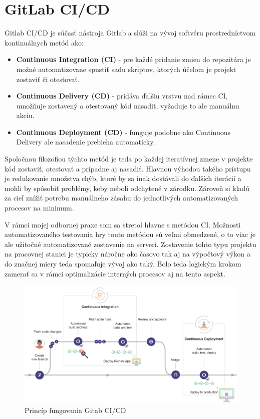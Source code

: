 \documentclass[slovak, bachelorpractice]{diploma}
\begin{document}
\section{GitLab CI/CD}
\label{sec:GitLab}
Gitlab CI/CD \cite{Cicd} je súčasť nástroja Gitlab a slúži na vývoj softvéru prostredníctvom kontinuálnych metód ako:
\begin{itemize}
  \item \textbf{Continuous Integration (CI)} - pre každé pridanie zmien do repozitára je možné automatizovane spustiť sadu skriptov, ktorých účelom je projekt zostaviť či otestovať.
  \item \textbf{Continuous Delivery (CD)} - pridáva ďalšiu vrstvu nad rámec CI, umožňuje zostavený a otestovaný kód nasadiť, vyžaduje to ale manuálnu akciu.
  \item \textbf{Continuous Deployment (CD)} - funguje podobne ako Continuous Delivery ale nasadenie prebieha automaticky.
\end{itemize}
Spoločnou filozofiou týchto metód je teda po každej iteratívnej zmene v projekte kód zostaviť, otestovať a prípadne aj nasadiť. Hlavnou výhodou takého prístupu je redukovanie množstva chýb, ktoré by sa inak dostávali do ďalších iterácií a mohli by spôsobiť problémy, keby neboli odchytené v zárodku. Zároveň si kladú za cieľ znížiť potrebu manuálneho zásahu do jednotlivých automatizovaných procesov na minimum.

V rámci mojej odbornej praxe som sa stretol hlavne s metódou CI. Možnosti automatizovaného testovania hry touto metódou sú veľmi obmedzené, o to viac je ale užitočné automatizované zostavenie na serveri. Zostavenie tohto typu projektu na pracovnej stanici je typicky náročne ako časovo tak aj na výpočtový výkon a do značnej miery teda spomaľuje vývoj ako taký. Bolo teda logickým krokom zamerať sa v rámci optimalizácie interných procesov aj na tento aspekt.

\begin{figure}[!htbp]
	\centering
	\includegraphics[width=.9\textwidth]{Pictures/gitlab.png}
	\vspace{-15pt}
	\caption{Princíp fungovania Gitab CI/CD \cite{Cicd}}
	\label{pic:Gitlab}
\end{figure}
\end{document}
